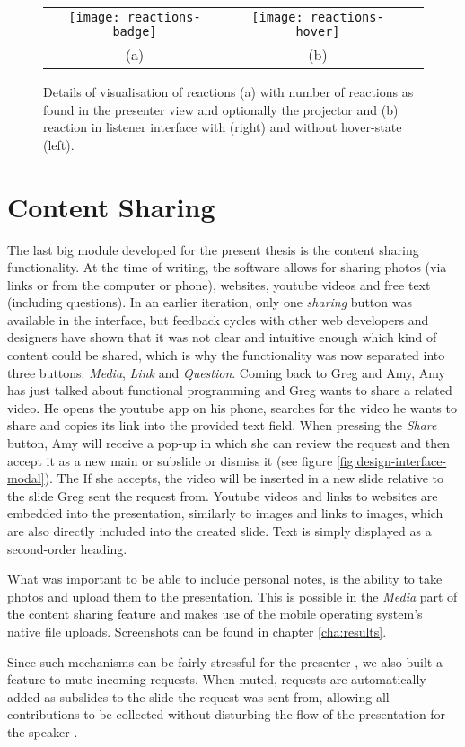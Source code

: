 \begin{figure}
\centering
\begin{tabular}{ccc}
\texttt{[image: reactions-badge]} &
\texttt{[image: reactions-hover]} \\
(a) & (b)
\end{tabular}
\caption{Details of visualisation of reactions (a) with number of reactions as found in the presenter view and optionally the projector and (b) reaction in listener interface with (right) and without hover-state (left).}
\label{fig:design-reactions-details}
\end{figure}

\section{Content Sharing}
The last big module developed for the present thesis is the content sharing functionality. At the time of writing, the software allows for sharing photos (via links or from the computer or phone), websites, youtube videos and free text (including questions). In an earlier iteration, only one \emph{sharing} button was available in the interface, but feedback cycles with other web developers and designers have shown that it was not clear and intuitive enough which kind of content could be shared, which is why the functionality was now separated into three buttons: \emph{Media}, \emph{Link} and \emph{Question}. Coming back to Greg and Amy, Amy has just talked about functional programming and Greg wants to share a related video. He opens the youtube app on his phone, searches for the video he wants to share and copies its link into the provided text field. When pressing the \emph{Share} button, Amy will receive a pop-up in which she can review the request and then accept it as a new main or subslide or dismiss it (see figure \ref{fig:design-interface-modal}). The  If she accepts, the video will be inserted in a new slide relative to the slide Greg sent the request from. Youtube videos and links to websites are embedded into the presentation, similarly to images and links to images, which are also directly included into the created slide. Text is simply displayed as a second-order heading.

What was important to be able to include personal notes, is the ability to take photos and upload them to the presentation. This is possible in the \emph{Media} part of the content sharing feature and makes use of the mobile operating system's native file uploads. Screenshots can be found in chapter \ref{cha:results}.

Since such mechanisms can be fairly stressful for the presenter \cite{Teevan:MobileFeedbackDuringPresentation, Wacker:PresenterExperience}, we also built a feature to mute incoming requests. When muted, requests are automatically added as subslides to the slide the request was sent from, allowing all contributions to be collected without disturbing the flow of the presentation for the speaker \cite{Dieberger:NarrativeFlow}.
